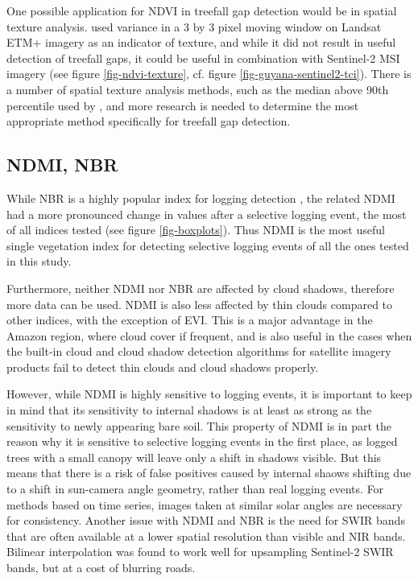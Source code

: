 \documentclass[a4paper,12pt]{scrbook}
\begin{document}
One possible application for \ac{NDVI} in treefall gap detection would be in spatial texture analysis. \citet{asner_remote_2002} used variance in a 3 by 3 pixel moving window on Landsat \ac{ETM+} imagery as an indicator of texture, and while it did not result in useful detection of treefall gaps, it could be useful in combination with Sentinel-2 \ac{MSI} imagery (see figure \ref{fig-ndvi-texture}, cf. figure \ref{fig-guyana-sentinel2-tci}). There is a number of spatial texture analysis methods, such as the median above 90th percentile used by \citet{hamunyela_using_2016}, and more research is needed to determine the most appropriate method specifically for treefall gap detection.

\subsection{NDMI, NBR}

While \ac{NBR} is a highly popular index for logging detection \citep{shimizu_using_2017, schneibel_assessment_2017}, the related \ac{NDMI} had a more pronounced change in values after a selective logging event, the most of all indices tested (see figure \ref{fig-boxplots}). Thus \ac{NDMI} is the most useful single vegetation index for detecting selective logging events of all the ones tested in this study.

Furthermore, neither \ac{NDMI} nor \ac{NBR} are affected by cloud shadows, therefore more data can be used. \ac{NDMI} is also less affected by thin clouds compared to other indices, with the exception of \ac{EVI}. This is a major advantage in the Amazon region, where cloud cover if frequent, and is also useful in the cases when the built-in cloud and cloud shadow detection algorithms for satellite imagery products fail to detect thin clouds and cloud shadows properly.

However, while \ac{NDMI} is highly sensitive to logging events, it is important to keep in mind that its sensitivity to internal shadows is at least as strong as the sensitivity to newly appearing bare soil. This property of \ac{NDMI} is in part the reason why it is sensitive to selective logging events in the first place, as logged trees with a small canopy will leave only a shift in shadows visible. But this means that there is a risk of false positives caused by internal shaows shifting due to a shift in sun-camera angle geometry, rather than real logging events. For methods based on time series, images taken at similar solar angles are necessary for consistency. Another issue with \ac{NDMI} and \ac{NBR} is the need for \ac{SWIR} bands that are often available at a lower spatial resolution than visible and \ac{NIR} bands. Bilinear interpolation was found to work well for upsampling Sentinel-2 \ac{SWIR} bands, but at a cost of blurring roads.
\end{document}
